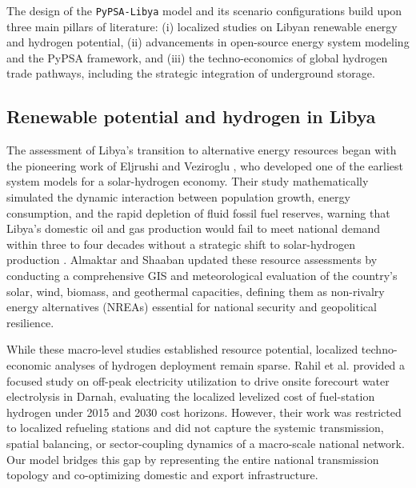 \documentclass[preprint,12pt]{elsarticle}
\begin{document}
The design of the \texttt{PyPSA-Libya} model and its scenario configurations build upon three main pillars of literature: (i) localized studies on Libyan renewable energy and hydrogen potential, (ii) advancements in open-source energy system modeling and the PyPSA framework, and (iii) the techno-economics of global hydrogen trade pathways, including the strategic integration of underground storage.

\subsection{Renewable potential and hydrogen in Libya}
The assessment of Libya’s transition to alternative energy resources began with the pioneering work of Eljrushi and Veziroglu \cite{eljrushi1990solar}, who developed one of the earliest system models for a solar-hydrogen economy. Their study mathematically simulated the dynamic interaction between population growth, energy consumption, and the rapid depletion of fluid fossil fuel reserves, warning that Libya's domestic oil and gas production would fail to meet national demand within three to four decades without a strategic shift to solar-hydrogen production \cite{eljrushi1990solar}. Almaktar and Shaaban \cite{almaktar2021prospects} updated these resource assessments by conducting a comprehensive GIS and meteorological evaluation of the country’s solar, wind, biomass, and geothermal capacities, defining them as non-rivalry energy alternatives (NREAs) essential for national security and geopolitical resilience. 

While these macro-level studies established resource potential, localized techno-economic analyses of hydrogen deployment remain sparse. Rahil et al. \cite{rahil2018techno} provided a focused study on off-peak electricity utilization to drive onsite forecourt water electrolysis in Darnah, evaluating the localized levelized cost of fuel-station hydrogen under 2015 and 2030 cost horizons. However, their work was restricted to localized refueling stations and did not capture the systemic transmission, spatial balancing, or sector-coupling dynamics of a macro-scale national network. Our model bridges this gap by representing the entire national transmission topology and co-optimizing domestic and export infrastructure.
\end{document}
